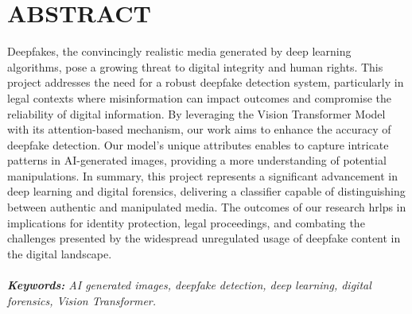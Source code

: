 


\section*{ABSTRACT}
\justify

Deepfakes, the convincingly realistic  media generated by deep learning algorithms, pose a growing threat to digital integrity and human rights. This project addresses the need for a robust deepfake detection system, particularly in legal contexts where misinformation can impact outcomes and compromise the reliability of digital information. By leveraging the Vision Transformer Model with its attention-based mechanism, our work aims to enhance the accuracy of deepfake detection. Our model's unique attributes enables to capture intricate patterns in AI-generated images, providing a more understanding of potential manipulations. In summary, this project represents a significant advancement in deep learning and digital forensics, delivering a classifier capable of distinguishing between authentic and manipulated media. The outcomes of our research hrlps in implications for identity protection, legal proceedings, and combating the challenges presented by the widespread unregulated usage of deepfake content in the digital landscape.\\
\\
\textit{\textbf{Keywords:} AI generated images, deepfake detection, deep learning, digital forensics, Vision Transformer.}


